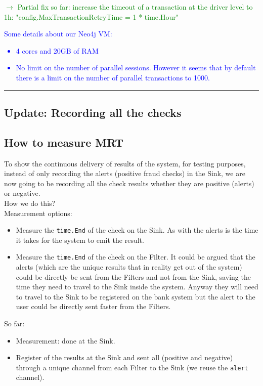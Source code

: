 \textcolor{green}{$\rightarrow$ Partial fix so far: increase the timeout of a transaction at the driver level to 1h: "config.MaxTransactionRetryTime = 1 * time.Hour"\\}

\textcolor{blue}{Some details about our Neo4j VM:
\begin{itemize}
    \item 4 cores and 20GB of RAM
    \item No limit on the number of parallel sessions. However it seems that by default there is a limit on the number of parallel transactions to 1000.
\end{itemize}
}
\rule{\textwidth}{0.4pt} 

\subsection{Update: Recording all the checks}

\subsection{How to measure MRT}\label{exp-measuring-mrt}

To show the continuous delivery of results of the system, for testing purposes, instead of only recording the alerts (positive fraud checks) in the Sink, we are now going to be recording all the check results whether they are positive (alerts) or negative.\\
How we do this?\\
Measurement options:
\begin{itemize}
    \item Measure the \texttt{time.End} of the check on the Sink. As with the alerts is the time it takes for the system to emit the result.
    \item Measure the \texttt{time.End} of the check on the Filter. It could be argued that the alerts (which are the unique results that in reality get out of the system) could be directly be sent from the Filters and not from the Sink, saving the time they need to travel to the Sink inside the system. Anyway they will need to travel to the Sink to be registered on the bank system but the alert to the user could be directly sent faster from the Filters.
\end{itemize}

So far:
\begin{itemize}
    \item Measurement: done at the Sink.
    \item Register of the results at the Sink and sent all (positive and negative) through a unique channel from each Filter to the Sink (we reuse the \texttt{alert} channel).
\end{itemize}


